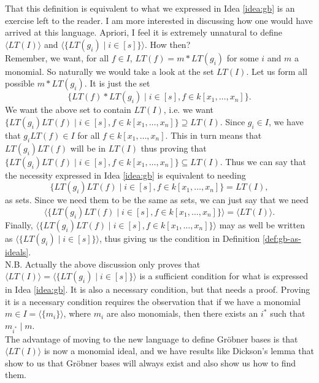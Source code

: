 \documentclass[10pt]{article}
\newcommand{\gb}{Gr\"{o}bner }
\newcommand*{\ideal}[1]{\langle#1\rangle}
\begin{document}
That this definition is equivalent to what we expressed in Idea \ref{idea:gb} is an exercise left to the reader. I am more interested in discussing how one would have arrived at this language. Apriori, I feel it is extremely unnatural to define $\ideal{LT(I)}$ and $\ideal{\{LT(g_i) \mid i \in [s]\}}$. How then? \\

Remember, we want, for all $f \in I$, $LT(f) = m*LT(g_i)$ for some $i$ and $m$ a monomial. So naturally we would take a look at the set $LT(I)$. Let us form all possible $m*LT(g_i)$. It is just the set
\[
\{LT(f) * LT(g_i) \mid i \in [s], f \in k[x_1, \ldots, x_n]\}.
\]
We want the above set to contain $LT(I)$, i.e. we want $\{LT(g_i)LT(f) \mid i \in [s], f \in k[x_1, \ldots, x_n]\} \supseteq LT(I)$. Since $g_i \in I$, we have that $g_iLT(f) \in I$ for all $f \in k[x_1, \ldots, x_n]$. This in turn means that $LT(g_i)LT(f)$ will be in $LT(I)$ thus proving that $\{LT(g_i)LT(f) \mid i \in [s], f \in k[x_1, \ldots, x_n]\} \subseteq LT(I)$. Thus we can say that the necessity expressed in Idea \ref{idea:gb} is equivalent to needing
\[\{LT(g_i)LT(f) \mid i \in [s], f \in k[x_1, \ldots, x_n]\} = LT(I),\]
as sets. Since we need them to be the same as sets, we can just say that we need
\[\ideal{\{LT(g_i)LT(f) \mid i \in [s], f \in k[x_1, \ldots, x_n]\}} = \ideal{LT(I)}.\] Finally, $\ideal{\{LT(g_i)LT(f) \mid i \in [s], f \in k[x_1, \ldots, x_n]\}}$ may as well be written as $\ideal{\{LT(g_i) \mid i \in [s]\}}$, thus giving us the condition in Definition \ref{def:gb-as-ideals}. \\

N.B. Actually the above discussion only proves that $\ideal{LT(I)} = \ideal{\{LT(g_i) \mid i \in [s]\}}$ is a sufficient condition for what is expressed in Idea \ref{idea:gb}. It is also a necessary condition, but that needs a proof. Proving it is a necessary condition requires the observation that if we have a monomial $m \in I = \ideal{\{m_i\}}$, where $m_i$ are also monomials, then there exists an $i^*$ such that $m_{i^*} \mid m$. \\

The advantage of moving to the new language to define \gb bases is that $\ideal{LT(I)}$ is now a monomial ideal, and we have results like Dickson's lemma that show to us that \gb bases will always exist and also show us how to find them.
%
% 
\end{document}
